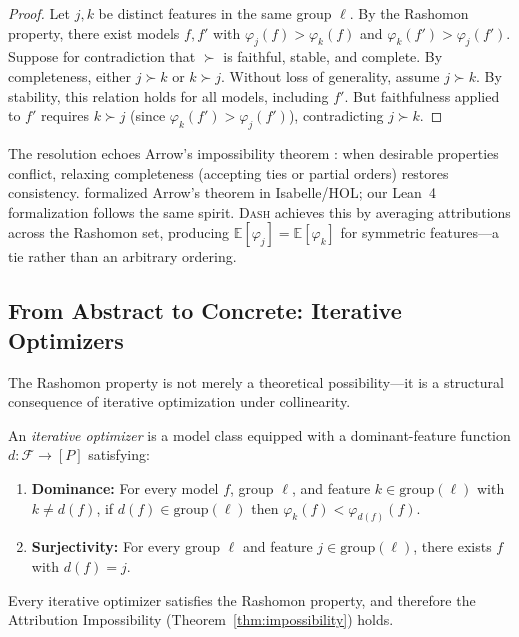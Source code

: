 \documentclass{jmlr}
\newcommand{\E}{\mathbb{E}}
\newcommand{\DASH}{\textsc{Dash}}
\begin{document}
\begin{proof}
Let $j, k$ be distinct features in the same group $\ell$.
By the Rashomon property, there exist models $f, f'$ with $\varphi_j(f) > \varphi_k(f)$ and $\varphi_k(f') > \varphi_j(f')$.
Suppose for contradiction that $\succ$ is faithful, stable, and complete.
By completeness, either $j \succ k$ or $k \succ j$.
Without loss of generality, assume $j \succ k$.
By stability, this relation holds for all models, including $f'$.
But faithfulness applied to $f'$ requires $k \succ j$ (since $\varphi_k(f') > \varphi_j(f')$), contradicting $j \succ k$.
\end{proof}

The resolution echoes Arrow's impossibility theorem \citep{arrow1951social}: when desirable properties conflict, relaxing completeness (accepting ties or partial orders) restores consistency. \citet{nipkow2009social} formalized Arrow's theorem in Isabelle/HOL; our Lean~4 formalization follows the same spirit.
\DASH{} achieves this by averaging attributions across the Rashomon set, producing $\E[\varphi_j] = \E[\varphi_k]$ for symmetric features---a tie rather than an arbitrary ordering.

\subsection{From Abstract to Concrete: Iterative Optimizers}
\label{sec:iterative}

The Rashomon property is not merely a theoretical possibility---it is a structural consequence of iterative optimization under collinearity.

\begin{definition}
\label{def:iterative}
An \emph{iterative optimizer} is a model class equipped with a dominant-feature function $d\colon \mathcal{F} \to [P]$ satisfying:
\begin{enumerate}
    \item \textbf{Dominance:} For every model $f$, group $\ell$, and feature $k \in \text{group}(\ell)$ with $k \neq d(f)$, if $d(f) \in \text{group}(\ell)$ then $\varphi_k(f) < \varphi_{d(f)}(f)$.
    \item \textbf{Surjectivity:} For every group $\ell$ and feature $j \in \text{group}(\ell)$, there exists $f$ with $d(f) = j$.
\end{enumerate}
\end{definition}

\begin{proposition}
\label{prop:iterative-rashomon}
Every iterative optimizer satisfies the Rashomon property, and therefore the Attribution Impossibility (Theorem~\ref{thm:impossibility}) holds.
\end{proposition}
\end{document}
